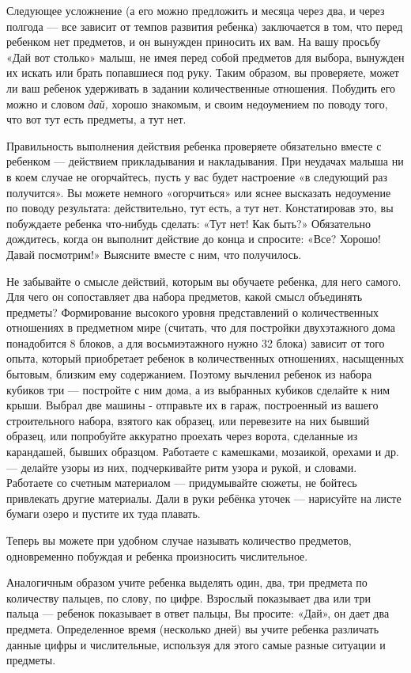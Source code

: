 \documentclass{book}
\renewcommand{\emph}[1]{\textit{#1}}
\begin{document}
Следующее усложнение (а его можно предложить и месяца через два, и через
полгода --- все зависит от темпов развития ребенка) заключается в том,
что перед ребенком нет предметов, и он вынужден приносить их вам. На
вашу просьбу «Дай вот столько» малыш, не имея перед собой предметов для
выбора, вынужден их искать или брать попавшиеся под руку. Таким образом,
вы проверяете, может ли ваш ребенок удерживать в задании количественные
отношения. Побудить его можно и словом \emph{дай,} хорошо знакомым, и
своим недоумением по поводу того, что вот тут есть предметы, а тут нет.

Правильность выполнения действия ребенка проверяете обязательно вместе с
ребенком --- действием прикладывания и накладывания. При неудачах малыша
ни в коем случае не огорчайтесь, пусть у вас будет настроение «в
следующий раз получится». Вы можете немного «огорчиться» или яснее
высказать недоумение по поводу результата: действительно, тут есть, а
тут нет. Констатировав это, вы побуждаете ребенка что-нибудь сделать:
«Тут нет! Как быть?» Обязательно дождитесь, когда он выполнит действие
до конца и спросите: «Все? Хорошо! Давай посмотрим!» Выясните вместе с
ним, что получилось.

Не забывайте о смысле действий, которым вы обучаете ребенка, для него
самого. Для чего он сопоставляет два набора предметов, какой смысл
объединять предметы? Формирование высокого уровня представлений о
количественных отношениях в предметном мире (считать, что для постройки
двухэтажного дома понадобится 8 блоков, а для восьмиэтажного нужно 32
блока) зависит от того опыта, который приобретает ребенок в
количественных отношениях, насыщенных бытовым, близким ему содержанием.
Поэтому вычленил ребенок из набора кубиков три --- постройте с ним дома,
а из выбранных кубиков сделайте к ним крыши. Выбрал две машины -
отправьте их в гараж, построенный из вашего строительного набора,
взятого как образец, или перевезите на них бывший образец, или
попробуйте аккуратно проехать через ворота, сделанные из карандашей,
бывших образцом. Работаете с камешками, мозаикой, орехами и др.---
делайте узоры из них, подчеркивайте ритм узора и рукой, и словами.
Работаете со счетным материалом --- придумывайте сюжеты, не бойтесь
привлекать другие материалы. Дали в руки ребёнка уточек --- нарисуйте на
листе бумаги озеро и пустите их туда плавать.

Теперь вы можете при удобном случае называть количество предметов,
одновременно побуждая и ребенка произносить числительное.

Аналогичным образом учите ребенка выделять один, два, три предмета по
количеству пальцев, по слову, по цифре. Взрослый показывает два или три
пальца --- ребенок показывает в ответ пальцы, Вы просите: «Дай», он дает
два предмета. Определенное время (несколько дней) вы учите ребенка
различать данные цифры и числительные, используя для этого самые разные
ситуации и предметы.
\end{document}
